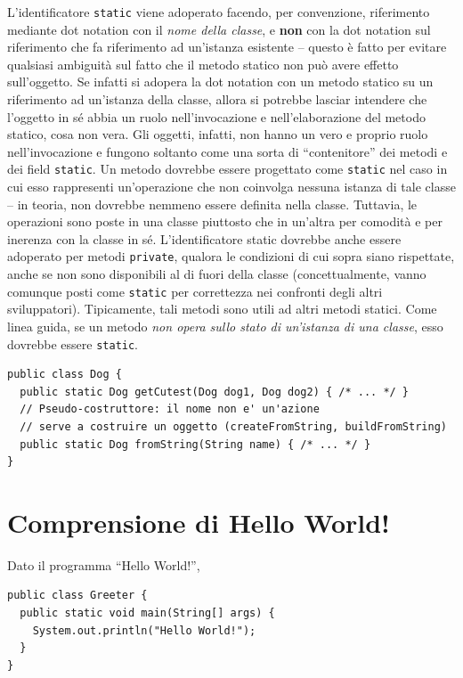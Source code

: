\documentclass[\fontsizeclass,twocolumn]{\classname}
\theoremstyle{definition}
\theoremstyle{definition}
\begin{document}
L'identificatore \texttt{static} viene adoperato facendo, per convenzione,
riferimento mediante dot notation con il \emph{nome della classe}, e
\textbf{non} con la dot notation sul riferimento che fa riferimento ad
un'istanza esistente \--- questo è fatto per evitare qualsiasi ambiguità sul
fatto che il metodo statico non può avere effetto sull'oggetto. Se infatti si
adopera la dot notation con un metodo statico su un riferimento ad un'istanza
della classe, allora si potrebbe lasciar intendere che l'oggetto in sé abbia un
ruolo nell'invocazione e nell'elaborazione del metodo statico, cosa non vera.
Gli oggetti, infatti, non hanno un vero e proprio ruolo nell'invocazione e
fungono soltanto come una sorta di ``contenitore'' dei metodi e dei field
\texttt{static}. Un metodo dovrebbe essere progettato come \texttt{static} nel
caso in cui esso rappresenti un'operazione che non coinvolga nessuna istanza di
tale classe \--- in teoria, non dovrebbe nemmeno essere definita nella classe.
Tuttavia, le operazioni sono poste in una classe piuttosto che in un'altra per
comodità e per inerenza con la classe in sé. L'identificatore static dovrebbe
anche essere adoperato per metodi \texttt{private}, qualora le condizioni di
cui sopra siano rispettate, anche se non sono disponibili al di fuori della
classe (concettualmente, vanno comunque posti come \texttt{static} per
correttezza nei confronti degli altri sviluppatori). Tipicamente, tali metodi
sono utili ad altri metodi statici. Come linea guida, se un metodo \emph{non
opera sullo stato di un'istanza di una classe}, esso dovrebbe essere
\texttt{static}.

\begin{lstlisting}
public class Dog {
  public static Dog getCutest(Dog dog1, Dog dog2) { /* ... */ }
  // Pseudo-costruttore: il nome non e' un'azione
  // serve a costruire un oggetto (createFromString, buildFromString)
  public static Dog fromString(String name) { /* ... */ }
}
\end{lstlisting}

\section{Comprensione di Hello World!}

Dato il programma ``Hello World!'',

\begin{lstlisting}
public class Greeter {
  public static void main(String[] args) {
    System.out.println("Hello World!");
  }
}
\end{lstlisting}
\end{document}
